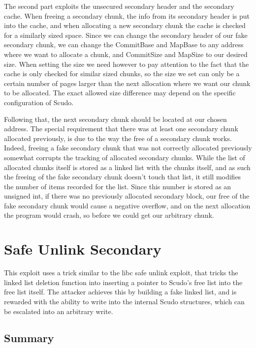 \documentclass[a4paper,11pt,oneside]{report}
\begin{document}
The second part exploits the unsecured secondary header and the secondary cache. When
freeing a secondary chunk, the info from its secondary header is put into the cache, and
when allocating a new secondary chunk the cache is checked for a similarly sized
space. Since we can change the secondary header of our fake secondary chunk, we can change
the CommitBase and MapBase to any address where we want to allocate a chunk, and
CommitSize and MapSize to our desired size. When setting the size we need however to pay
attention to the fact that the cache is only checked for similar sized chunks, so the size
we set can only be a certain number of pages larger than the next allocation where we want
our chunk to be allocated. The exact allowed size difference may depend on the specific
configuration of Scudo.

Following that, the next secondary chunk should be located at our chosen address. The
special requirement that there was at least one secondary chunk allocated previously, is
due to the way the free of a secondary chunk works. Indeed, freeing a fake secondary chunk
that was not correctly allocated previously somewhat corrupts the tracking of allocated
secondary chunks. While the list of allocated chunks itself is stored as a linked list
with the chunks itself, and as such the freeing of the fake secondary chunk doesn't touch
that list, it still modifies the number of items recorded for the list. Since this number
is stored as an unsigned int, if there was no previously allocated secondary block, our
free of the fake secondary chunk would cause a negative overflow, and on the next
allocation the program would crash, so before we could get our arbitrary chunk.


\section{Safe Unlink Secondary}

This exploit uses a trick similar to the libc safe unlink exploit, that tricks the linked
list deletion function into inserting a pointer to Scudo's free list into the free list
itself. The attacker achieves this by building a fake linked list, and is rewarded with
the ability to write into the internal Scudo structures, which can be escalated into an
arbitrary write.

\subsection{Summary}
\end{document}
